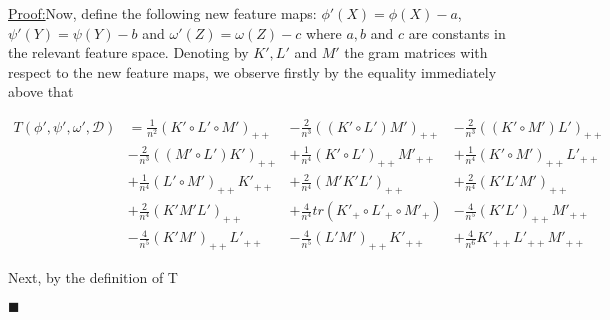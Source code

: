 \documentclass{article}
\newenvironment{claimproof}[1]{\par\noindent\underline{Proof:}\space#1}{\hfill $\blacksquare$}
\begin{document}
\begin{claimproof}
Now, define the following new feature maps: $\phi'(X) = \phi(X) - a$, $\psi'(Y) = \psi(Y) - b$ and $\omega'(Z) = \omega(Z) - c$ where $a,b$ and $c$ are constants in the relevant feature space. Denoting by $K', L'$ and $M'$ the gram matrices with respect to the new feature maps, we observe firstly by the equality immediately above that 

\begin{align*}
T(\phi',\psi',\omega',\mathcal{D}) &= \frac{1}{n^2}(K' \circ L'\circ M')_{++} &-
\frac{2}{n^3}((K'\circ L') M')_{++} & - 
\frac{2}{n^3}((K' \circ M') L')_{++} \\&- 
\frac{2}{n^3}((M' \circ L') K')_{++} &+ 
\frac{1}{n^4}(K' \circ L')_{++} M'_{++} &+ 
\frac{1}{n^4}(K' \circ M')_{++} L'_{++} \\&+ 
\frac{1}{n^4}(L' \circ M')_{++} K'_{++} &+ 
\frac{2}{n^4}(M'K'L')_{++} &+ 
\frac{2}{n^4}(K'L'M')_{++} \\&+ 
\frac{2}{n^4}(K'M'L')_{++} &+ 
\frac{4}{n^4}tr(K'_+ \circ L'_+ \circ M'_+) &-
\frac{4}{n^5}(K' L')_{++} M'_{++} \\& - 
\frac{4}{n^5}(K'M')_{++}L'_{++} &- 
\frac{4}{n^5}(L'M')_{++} K'_{++} &+
\frac{4}{n^6}K'_{++} L'_{++} M'_{++}
\end{align*}

Next, by the definition of T


\end{claimproof}
\end{document}
